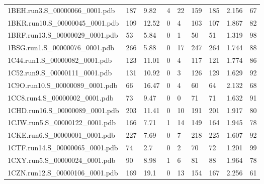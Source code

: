 \documentclass{bioinfo}
\begin{document}
\begin{table}[!t]
{\begin{tabular}{lllllllll}
    1BEH.run3.S\_00000066\_0001.pdb & 187      & 9.82       & 4           & 22          & 159         & 185     & 2.156           & 67           \\
    1BKR.run10.S\_00000045\_0001.pdb & 109      & 12.52      & 0           & 4           & 103         & 107     & 1.867           & 82           \\
    1BRF.run13.S\_00000029\_0001.pdb & 53       & 5.84       & 0           & 1           & 50          & 51      & 1.319           & 98           \\
    1BSG.run1.S\_00000076\_0001.pdb & 266      & 5.88       & 0           & 17          & 247         & 264     & 1.744           & 88           \\
    1C44.run1.S\_00000082\_0001.pdb & 123      & 11.01      & 0           & 4           & 117         & 121     & 1.774           & 86           \\
    1C52.run9.S\_00000111\_0001.pdb & 131      & 10.92      & 0           & 3           & 126         & 129     & 1.629           & 92           \\
    1C9O.run10.S\_00000089\_0001.pdb & 66       & 16.47      & 0           & 4           & 60          & 64      & 2.132           & 68           \\
    1CC8.run4.S\_00000002\_0001.pdb & 73       & 9.47       & 0           & 0           & 71          & 71      & 1.632           & 91           \\
    1CHD.run16.S\_00000089\_0001.pdb & 203      & 11.41      & 0           & 10          & 191         & 201     & 1.917           & 80           \\
    1CJW.run5.S\_00000122\_0001.pdb & 166      & 7.71       & 1           & 14          & 149         & 164     & 1.945           & 78           \\
    1CKE.run6.S\_00000001\_0001.pdb & 227      & 7.69       & 0           & 7           & 218         & 225     & 1.607           & 92           \\
    1CTF.run14.S\_00000065\_0001.pdb & 74       & 2.7        & 0           & 2           & 70          & 72      & 1.201           & 99           \\
    1CXY.run5.S\_00000024\_0001.pdb & 90       & 8.98       & 1           & 6           & 81          & 88      & 1.964           & 78           \\
    1CZN.run12.S\_00000106\_0001.pdb & 169      & 19.1       & 0           & 13          & 154         & 167     & 2.256           & 61           \\

\end{tabular}}
\end{table}
\end{document}
